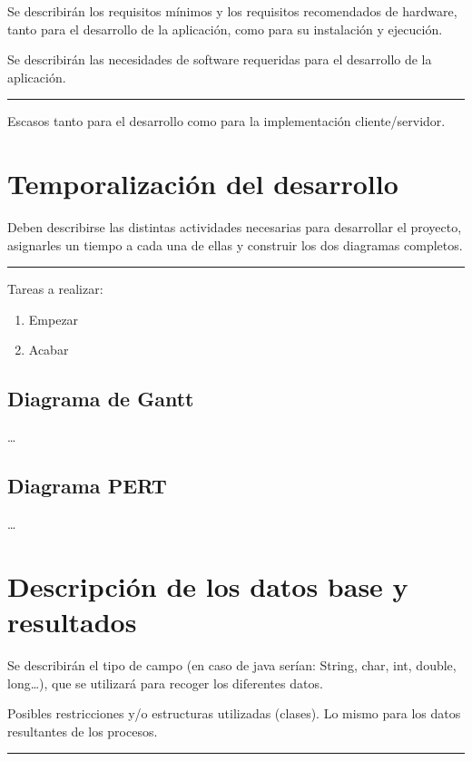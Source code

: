 \documentclass[12pt,a4paper,titlepage]{article}
\begin{document}
    Se describirán los requisitos mínimos y los requisitos recomendados de hardware, tanto para el desarrollo de la aplicación, como para su instalación y ejecución.

    Se describirán las necesidades de software requeridas para el desarrollo de la aplicación.

    \bigskip\hrule\bigskip

    Escasos tanto para el desarrollo como para la implementación cliente/servidor.

    \section{Temporalización del desarrollo}

    Deben describirse las distintas actividades necesarias para desarrollar el proyecto, asignarles un tiempo a cada una de ellas y construir los dos diagramas completos.

    \bigskip\hrule\bigskip

    Tareas a realizar:

    \begin{enumerate}
        \item Empezar
        \item Acabar
    \end{enumerate}

    \subsection{Diagrama de Gantt}

    \dots

    \subsection{Diagrama PERT}

    \dots

    \section{Descripción de los datos base y resultados}

    Se describirán el tipo de campo (en caso de java serían: String, char, int, double, long\dots), que se utilizará para recoger los diferentes datos.

    Posibles restricciones y/o estructuras utilizadas (clases). Lo mismo para los datos resultantes de los procesos.

    \bigskip\hrule\bigskip
\end{document}
